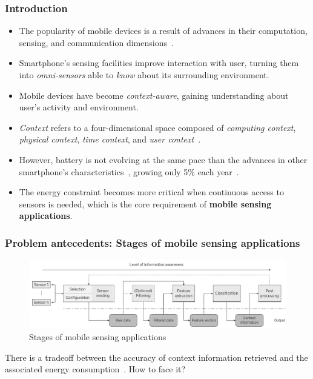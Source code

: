 \documentclass[compress,9pt,xcolor={dvipsnames,table}]{beamer}
\begin{document}
\begin{frame}[t]\frametitle{Introduction}
\begin{itemize}
  \item The popularity of mobile devices is a result of advances in their computation, sensing, and communication dimensions~\cite{Islam2014}.
  \item Smartphone's sensing facilities improve interaction with user, turning them into \emph{omni-sensors} able to \emph{know} about its surrounding environment.
  \item Mobile devices have become \emph{context-aware}, gaining understanding about user's activity and environment.
  \item \emph{Context} refers to a four-dimensional space composed of \emph{computing context}, \emph{physical context}, \emph{time context}, and \emph{user context}~\cite{Chen2000}.
  \item However, battery is not evolving at the same pace than the advances in other smartphone's characteristics~\cite{Kjaergaard2012}, growing only 5\% each year~\cite{Ma2012}.
  \item The energy constraint becomes more critical when continuous access to sensors is needed, which is the core requirement of \textbf{mobile sensing applications}.
\end{itemize}
\end{frame}

\begin{frame}[t]\frametitle{Problem antecedents: Stages of mobile sensing applications}
\begin{figure}[tb]
  \centering
  \includegraphics[width=\textwidth]{../../../resources/images/vectors/msa-stages}
  \caption{Stages of mobile sensing applications}
  \label{fig:msa-stages}
\end{figure}
There is a tradeoff between the accuracy of context information retrieved and the associated energy consumption~\cite{Sim2014,Rachuri2012}.
How to face it?
\end{frame}
\end{document}
